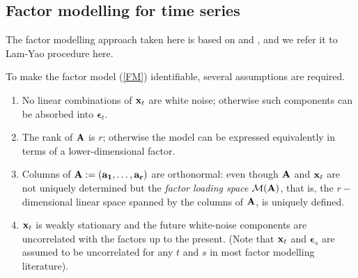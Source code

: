 \documentclass{article} %
\begin{document}

\subsection{Factor modelling for time series}
The factor modelling approach taken here is based on \cite{ly_fm12} and \cite{lyb_fm11}, and we refer it to Lam-Yao procedure here.

To make the factor model (\ref{FM}) identifiable, several assumptions are required.
\begin{enumerate}
\item No linear combinations of ${\bf x}_t$ are white noise; otherwise such components can be absorbed into ${\bm \epsilon}_t$.
\item The rank of $\bf A$ is $r$; otherwise the model can be expressed equivalently in terms of a lower-dimensional factor.
\item Columns of $\bf A:=({\bf a}_1,\ldots,{\bf a}_r)$ are orthonormal: even though $\bf A$ and ${\bf x}_t$ are not uniquely determined but the {\it factor loading space} ${\cal M}({\bf A})$, that is, the $r-$dimensional linear space spanned by the columns of $\bf A$, is uniquely defined.
\item ${\bf x}_t$ is weakly stationary and the future white-noise components are uncorrelated with the factors up to the present. (Note that ${\bf x}_t$ and ${\bm\epsilon}_s$ are assumed to be uncorrelated for any $t$ and $s$ in most factor modelling literature).
\end{enumerate}
\end{document}
